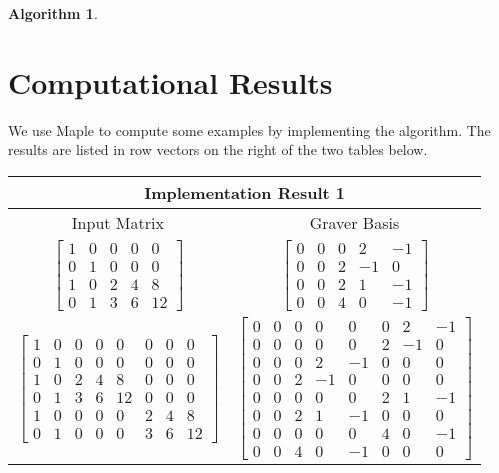 \documentclass{article}
\theoremstyle{plain}
\theoremstyle{definition}
\newtheorem{algorithm}[theorem]{Algorithm}
\begin{document}
\begin{algorithm}
\section{Computational Results}
We use Maple to compute some examples by implementing the algorithm. The results are listed in row vectors on the right of the two tables below.
\begin{center}
\begin{tabular}{ |c|c| }
\hline
\multicolumn{2}{|c|}{Implementation Result 1} \\
\hline
 Input Matrix &Graver Basis \\
 \hline
 $
 \left[\begin{array}{ccccc}
1 & 0 & 0 & 0 & 0 \\
0 & 1 & 0 & 0 & 0 \\
1 & 0 & 2 & 4 & 8 \\
0 & 1 & 3 & 6 & 12
\end{array}\right]$   &   $ \left[\begin{array}{ccccc}
0 & 0 & 0 & 2 & -1 \\
0 & 0 & 2 & -1 & 0 \\
0 & 0 & 2 & 1 & -1 \\
0 & 0 & 4 & 0 & -1
\end{array}\right]$  \\
\hline 
$\left[\begin{array}{cccccccc}
1 & 0 & 0 & 0 & 0 & 0 & 0 & 0 \\
0 & 1 & 0 & 0 & 0 & 0 & 0 & 0 \\
1 & 0 & 2 & 4 & 8 & 0 & 0 & 0 \\
0 & 1 & 3 & 6 & 12 & 0 & 0 & 0 \\
1 & 0 & 0 & 0 & 0 & 2 & 4 & 8 \\
0 & 1 & 0 & 0 & 0 & 3 & 6 & 12
\end{array}\right]$ & $\left[\begin{array}{cccccccc}
0 & 0 & 0 & 0 & 0 & 0 & 2 & -1 \\
0 & 0 & 0 & 0 & 0 & 2 & -1 & 0 \\
0 & 0 & 0 & 2 & -1 & 0 & 0 & 0 \\
0 & 0 & 2 & -1 & 0 & 0 & 0 & 0 \\
0 & 0 & 0 & 0 & 0 & 2 & 1 & -1 \\
0 & 0 & 2 & 1 & -1 & 0 & 0 & 0 \\
0 & 0 & 0 & 0 & 0 & 4 & 0 & -1 \\
0 & 0 & 4 & 0 & -1 & 0 & 0 & 0
\end{array}\right]$     \\
\hline
\end{tabular}
\end{center}


\end{algorithm}
\end{document}
